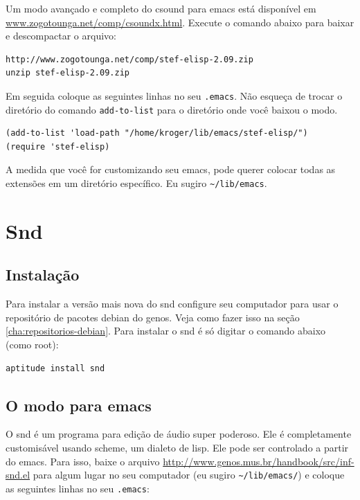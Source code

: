 \documentclass[12pt,brazil]{book}
\begin{document}
Um modo avançado e completo do csound para emacs está disponível em
\url{www.zogotounga.net/comp/csoundx.html}. Execute o comando abaixo
para baixar e descompactar o arquivo:

\begin{verbatim}
http://www.zogotounga.net/comp/stef-elisp-2.09.zip
unzip stef-elisp-2.09.zip
\end{verbatim}

Em seguida coloque as seguintes linhas no seu \texttt{.emacs}. Não
esqueça de trocar o diretório do comando \texttt{add-to-list} para o
diretório onde você baixou o modo.

\begin{verbatim}
(add-to-list 'load-path "/home/kroger/lib/emacs/stef-elisp/")
(require 'stef-elisp)
\end{verbatim}

A medida que você for customizando seu emacs, pode querer colocar
todas as extensões em um diretório específico. Eu sugiro
\verb|~/lib/emacs|.

\chapter{Snd}
\label{cha:snd}

\section{Instalação}
\label{sec:instalacao-5}

Para instalar a versão mais nova do snd configure seu computador para
usar o repositório de pacotes debian do genos. Veja como fazer isso na
seção \ref{cha:repositorios-debian}. Para instalar o snd é só digitar
o comando abaixo (como root):

\begin{verbatim}
aptitude install snd
\end{verbatim}

\section{O modo para emacs}
\label{sec:o-modo-para-1}

O snd é um programa para edição de áudio super poderoso. Ele é
completamente customisável usando scheme, um dialeto de lisp. Ele pode
ser controlado a partir do emacs. Para isso, baixe o arquivo
\url{http://www.genos.mus.br/handbook/src/inf-snd.el} para algum lugar no seu
computador (eu sugiro \verb|~/lib/emacs/|) e coloque as seguintes
linhas no seu \texttt{.emacs}:
\end{document}
